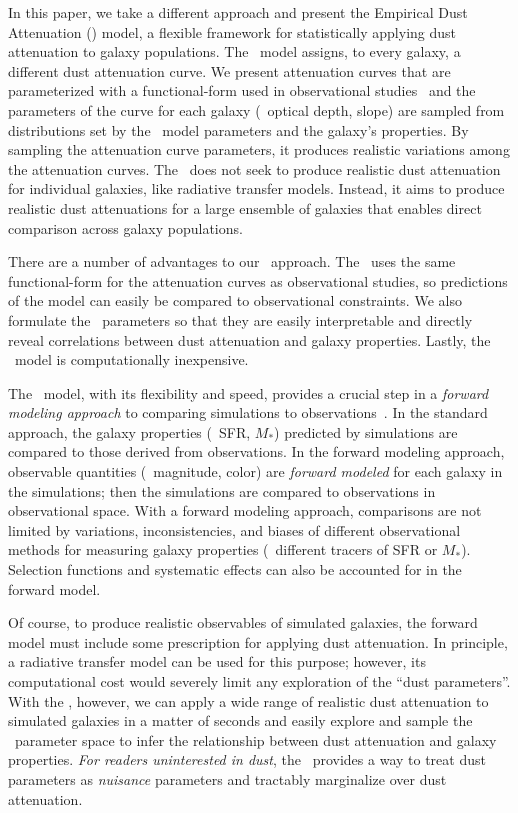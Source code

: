 In this paper, we take a different approach and present the Empirical Dust
Attenuation (\eda) model, a flexible framework for statistically applying dust
attenuation to galaxy populations. The \eda~model assigns, to every galaxy, a
different dust attenuation curve. We present attenuation curves that are parameterized with
a functional-form used in observational studies~\citep{noll2009} and the
parameters of the curve for each galaxy (\eg~optical depth, slope) are sampled
from distributions set by the \eda~model parameters and the galaxy's properties.  
By sampling the attenuation curve parameters, it produces realistic variations 
among the attenuation curves. The \eda~does not seek to produce realistic dust 
attenuation for individual galaxies, like radiative transfer models. Instead, 
it aims to produce realistic dust attenuations for a large ensemble of galaxies
that enables direct comparison across galaxy populations. 

There are a number of advantages to our \eda~approach. The \eda~uses the same
functional-form for the attenuation curves as observational studies, so
predictions of the model can easily be compared to observational constraints. 
We also formulate the \eda~parameters so that they are easily interpretable and
directly reveal correlations between dust attenuation and galaxy properties.
Lastly, the \eda~model is computationally inexpensive. 

The \eda~model, with its flexibility and speed, provides a crucial step in a
{\em forward modeling approach} to comparing simulations to
observations~\citep[\eg][]{nelson2018, baes2019, trcka2020, dickey2020}.
In the standard approach, the galaxy properties (\eg~SFR, $M_*$) predicted by
simulations are compared to those derived from observations. In the forward
modeling approach, observable quantities (\eg~magnitude, color) are {\em forward
modeled} for each galaxy in the simulations; then the simulations are compared 
to observations in observational space. With a forward modeling approach, 
comparisons are not limited by variations, inconsistencies, and biases of different
observational methods for measuring galaxy properties (\eg~different tracers of
SFR or $M_*$). Selection functions and systematic effects can also be accounted
for in the forward model. 

Of course, to produce realistic observables of simulated galaxies, the forward
model must include some prescription for applying dust attenuation. In
principle, a radiative transfer model can be used for this purpose; however,
its computational cost would severely limit any exploration of the ``dust
parameters''. With the \eda, however, we can apply a wide range of realistic
dust attenuation to simulated galaxies in a matter of seconds and easily
explore and sample the \eda~parameter space to infer the 
relationship between dust attenuation and galaxy properties. {\em For readers 
uninterested in dust}, the \eda~provides a way to treat dust parameters as
{\em nuisance} parameters and tractably marginalize over dust attenuation. 

